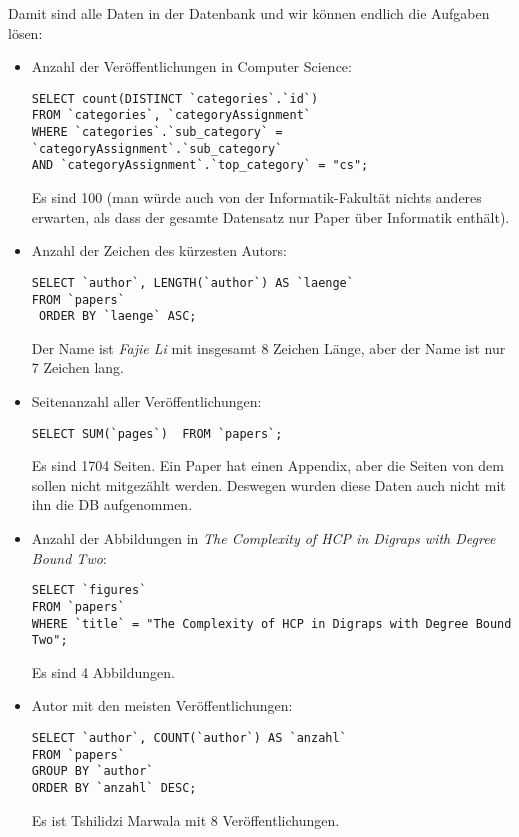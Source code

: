 \documentclass{article}
\begin{document}
	Damit sind alle Daten in der Datenbank und wir können endlich die Aufgaben lösen:
	\begin{itemize}
		\item Anzahl der Veröffentlichungen in Computer Science:
		\begin{lstlisting}[style=sql, tabsize=2]
SELECT count(DISTINCT `categories`.`id`) 
FROM `categories`, `categoryAssignment` 
WHERE `categories`.`sub_category` = `categoryAssignment`.`sub_category` 
AND `categoryAssignment`.`top_category` = "cs";
		\end{lstlisting}
		Es sind 100 (man würde auch von der Informatik-Fakultät nichts anderes erwarten, als dass der gesamte Datensatz nur Paper über Informatik enthält).
		\item Anzahl der Zeichen des kürzesten Autors:
		\begin{lstlisting}[style=sql,tabsize=2]
SELECT `author`, LENGTH(`author`) AS `laenge` 
FROM `papers`
 ORDER BY `laenge` ASC;
		\end{lstlisting}
		Der Name ist \textit{Fajie Li} mit insgesamt 8 Zeichen Länge, aber der Name ist nur 7 Zeichen lang.
		\item Seitenanzahl aller Veröffentlichungen:
		\begin{lstlisting}[style=sql,tabsize=2]
SELECT SUM(`pages`)  FROM `papers`;
		\end{lstlisting}
		Es sind 1704 Seiten. Ein Paper hat einen Appendix, aber die Seiten von dem sollen nicht mitgezählt werden. Deswegen wurden diese Daten auch nicht mit ihn die DB aufgenommen.
		\item Anzahl der Abbildungen in \textit{The Complexity of HCP in Digraps with Degree Bound Two}:
		\begin{lstlisting}[style=sql,tabsize=2]
SELECT `figures` 
FROM `papers` 
WHERE `title` = "The Complexity of HCP in Digraps with Degree Bound Two";
		\end{lstlisting}
		Es sind 4 Abbildungen.
		\item Autor mit den meisten Veröffentlichungen:
		\begin{lstlisting}[style=sql,tabsize=2]
SELECT `author`, COUNT(`author`) AS `anzahl` 
FROM `papers` 
GROUP BY `author` 
ORDER BY `anzahl` DESC;
		\end{lstlisting}
		Es ist Tshilidzi Marwala mit 8 Veröffentlichungen.
	\end{itemize}
	
\end{document}
